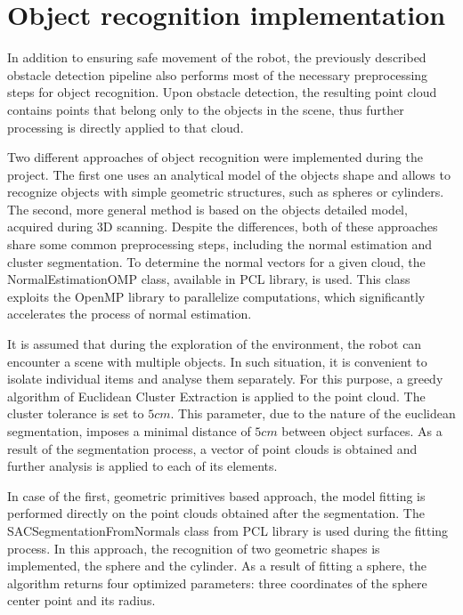 	


\section{Object recognition implementation}
\label{sec:detection}

In addition to ensuring safe movement of the robot, the previously described obstacle  detection pipeline also performs most of the necessary preprocessing steps for object recognition. Upon obstacle detection, the resulting point cloud contains points that belong only to the objects in the scene, thus further processing is directly applied to that cloud. 

Two different approaches of object recognition were implemented during the project. The first one uses an analytical model of the objects shape and allows to recognize objects with simple geometric structures, such as spheres or cylinders. The second, more general method is based on the objects detailed model, acquired during 3D scanning. Despite the differences, both of these approaches share some common preprocessing steps, including the normal estimation and cluster segmentation. To determine the normal vectors for a given cloud, the NormalEstimationOMP class, available in PCL library, is used. This class exploits the OpenMP library to parallelize computations, which significantly accelerates the process of normal estimation. 

	It is assumed that during the exploration of the environment, the robot can encounter a scene with multiple objects. In such situation, it is convenient to isolate individual items and analyse them separately. For this purpose, a greedy algorithm of Euclidean Cluster Extraction is applied to the point cloud. The cluster tolerance is set to $5cm$. This parameter, due to the nature of the euclidean segmentation, imposes a minimal distance of $5cm$ between object surfaces. As a result of the segmentation process, a vector of point clouds is obtained and further analysis is applied to each of its elements.
	
	In case of the first, geometric primitives based approach, the model fitting is performed directly on the point clouds obtained after the segmentation. The SACSegmentationFromNormals class from PCL library is used during the fitting process. In this approach, the recognition of two geometric shapes is implemented, the sphere and the cylinder. As a result of fitting a sphere, the algorithm returns four optimized parameters: three coordinates of the sphere center point and its radius.
	
